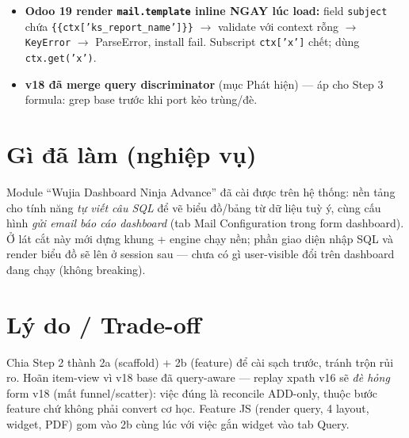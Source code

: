 \begin{itemize}
  \item \textbf{Odoo 19 render \texttt{mail.template} inline NGAY lúc load:} field
    \texttt{subject} chứa \texttt{\{\{ctx['ks\_report\_name']\}\}} $\to$ validate với context
    rỗng $\to$ \texttt{KeyError} $\to$ ParseError, install fail. Subscript \texttt{ctx['x']}
    chết; dùng \texttt{ctx.get('x')}.
  \item \textbf{v18 đã merge query discriminator} (mục Phát hiện) --- áp cho Step 3 formula:
    grep base trước khi port kẻo trùng/đè.
\end{itemize}

\section{Gì đã làm (nghiệp vụ)}

Module ``Wujia Dashboard Ninja Advance'' đã cài được trên hệ thống: nền tảng cho tính năng
\emph{tự viết câu SQL} để vẽ biểu đồ/bảng từ dữ liệu tuỳ ý, cùng cấu hình \emph{gửi email
báo cáo dashboard} (tab Mail Configuration trong form dashboard). Ở lát cắt này mới dựng
khung + engine chạy nền; phần giao diện nhập SQL và render biểu đồ sẽ lên ở session sau ---
chưa có gì user-visible đổi trên dashboard đang chạy (không breaking).

\section{Lý do / Trade-off}

Chia Step 2 thành 2a (scaffold) + 2b (feature) để cài sạch trước, tránh trộn rủi ro. Hoãn
item-view vì v18 base đã query-aware --- replay xpath v16 sẽ \emph{đè hỏng} form v18 (mất
funnel/scatter): việc đúng là reconcile ADD-only, thuộc bước feature chứ không phải convert
cơ học. Feature JS (render query, 4 layout, widget, PDF) gom vào 2b cùng lúc với việc gắn
widget vào tab Query.
